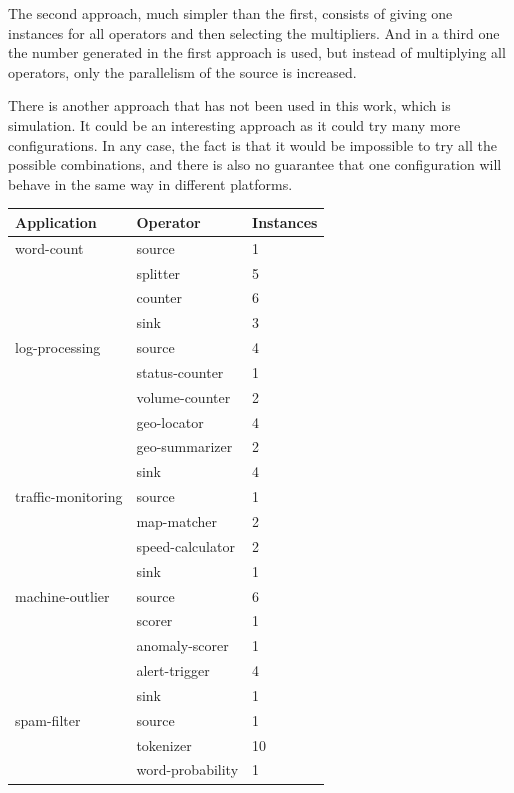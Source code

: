 \documentclass[ppgc,diss,english]{iiufrgs}
\begin{document}
The second approach, much simpler than the first, consists of giving one instances for all operators and then selecting the multipliers. And in a third one the number generated in the first approach is used, but instead of multiplying all operators, only the parallelism of the source is increased.

There is another approach that has not been used in this work, which is simulation. It could be an interesting approach as it could try many more configurations. In any case, the fact is that it would be impossible to try all the possible combinations, and there is also no guarantee that one configuration will behave in the same way in different platforms.

\begin{table}[t]
\begin{center}
	\footnotesize
\begin{tabular}{ | l | l | l | }
\hline
	Application & Operator & Instances \\ \hline
	word-count & source & 1 \\ \hline
	 & splitter & 5 \\ \hline
	 & counter & 6 \\ \hline
	 & sink & 3 \\ \hline
	log-processing & source & 4 \\ \hline
	 & status-counter & 1 \\ \hline
	 & volume-counter & 2 \\ \hline
	 & geo-locator & 4 \\ \hline
	 & geo-summarizer & 2 \\ \hline
	 & sink & 4 \\ \hline
	traffic-monitoring & source & 1 \\ \hline
	 & map-matcher & 2 \\ \hline
	 & speed-calculator & 2 \\ \hline
	 & sink & 1 \\ \hline
	machine-outlier & source & 6 \\ \hline
	 & scorer & 1 \\ \hline
	 & anomaly-scorer & 1 \\ \hline
	 & alert-trigger & 4 \\ \hline
	 & sink & 1 \\ \hline
	spam-filter & source & 1 \\ \hline
	 & tokenizer & 10 \\ \hline
	 & word-probability & 1 \\ \hline

\end{tabular}
\end{center}
\end{table}
\end{document}
